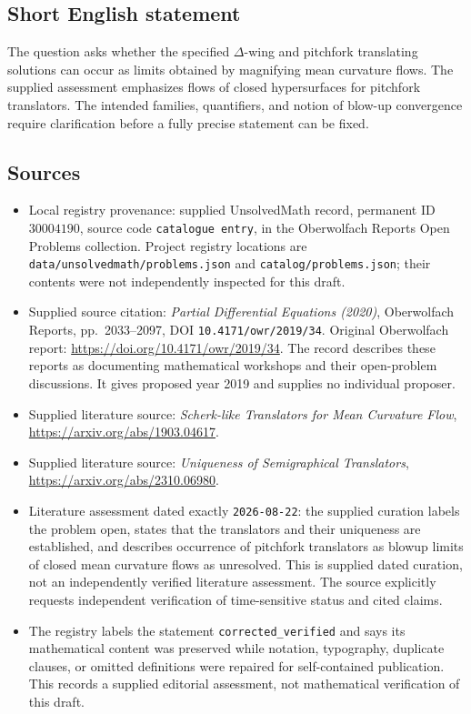 \documentclass[11pt]{article}
\begin{document}
\subsection{Short English statement}
The question asks whether the specified \(\Delta\)-wing and pitchfork translating solutions can occur as limits obtained by magnifying mean curvature flows. The supplied assessment emphasizes flows of closed hypersurfaces for pitchfork translators. The intended families, quantifiers, and notion of blow-up convergence require clarification before a fully precise statement can be fixed.
\subsection{Sources}
\begin{itemize}
\item Local registry provenance: supplied UnsolvedMath record, permanent ID \(30004190\), source code \texttt{catalogue entry}, in the Oberwolfach Reports Open Problems collection. Project registry locations are \texttt{data/unsolvedmath/problems.json} and \texttt{catalog/problems.json}; their contents were not independently inspected for this draft.
\item Supplied source citation: \emph{Partial Differential Equations (2020)}, Oberwolfach Reports, pp.\ 2033--2097, DOI \texttt{10.4171/owr/2019/34}. Original Oberwolfach report: \url{https://doi.org/10.4171/owr/2019/34}. The record describes these reports as documenting mathematical workshops and their open-problem discussions. It gives proposed year 2019 and supplies no individual proposer.
\item Supplied literature source: \emph{Scherk-like Translators for Mean Curvature Flow}, \url{https://arxiv.org/abs/1903.04617}.
\item Supplied literature source: \emph{Uniqueness of Semigraphical Translators}, \url{https://arxiv.org/abs/2310.06980}.
\item Literature assessment dated exactly \texttt{2026-08-22}: the supplied curation labels the problem open, states that the translators and their uniqueness are established, and describes occurrence of pitchfork translators as blowup limits of closed mean curvature flows as unresolved. This is supplied dated curation, not an independently verified literature assessment. The source explicitly requests independent verification of time-sensitive status and cited claims.
\item The registry labels the statement \texttt{corrected\_verified} and says its mathematical content was preserved while notation, typography, duplicate clauses, or omitted definitions were repaired for self-contained publication. This records a supplied editorial assessment, not mathematical verification of this draft.
\end{itemize}
\end{document}

